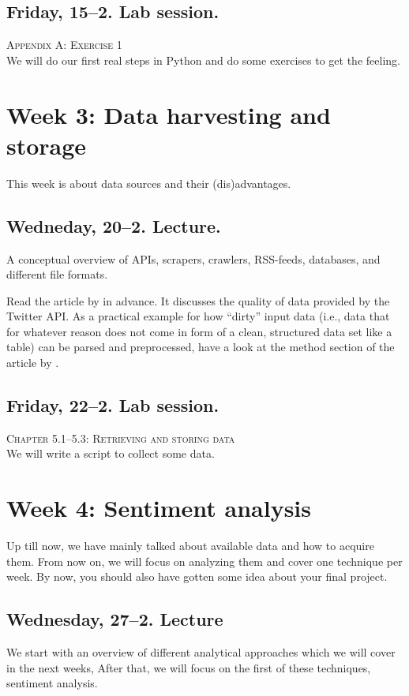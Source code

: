 \documentclass[a4paper,10pt]{report}
\begin{document}
\subsection*{Friday, 15--2. Lab session.}
\textsc{ Appendix A: Exercise 1}\\
We will do our first real steps in Python and do some exercises to get the feeling. 


\section*{Week 3: Data harvesting and storage}
This week is about data sources and their (dis)advantages. 

\subsection*{Wedneday, 20--2. Lecture.}
A conceptual overview of APIs, scrapers, crawlers, RSS-feeds, databases, and different file formats.

Read the article by \cite{Morstatter2013} in advance. It discusses the quality of data provided by the Twitter API. As a practical example for how ``dirty'' input data (i.e., data that for whatever reason does not come in form of a clean, structured data set like a table) can be parsed and preprocessed, have a look at the method section of the article by \cite{Lewis2013}. 


\subsection*{Friday, 22--2. Lab session.}
\textsc{ Chapter 5.1--5.3: Retrieving and storing data}\\
We will write a script to collect some data. 




\section*{Week 4: Sentiment analysis}
Up till now, we have mainly talked about available data and how to acquire them. From now on, we will focus on analyzing them and cover one technique per week. By now, you should also have gotten some idea about your final project.


\subsection*{Wednesday, 27--2. Lecture}
We start with an overview of different analytical approaches which we will cover in the next weeks, After that, we will focus on the first of these techniques, sentiment analysis.
\end{document}
